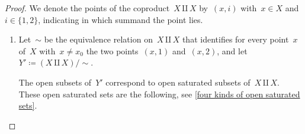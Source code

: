 \begin{proof}
	We denote the points of the coproduct~$X ⨿ X$ by~$(x, i)$ with~$x ∈ X$ and~$i ∈ \{ 1, 2 \}$, indicating in which summand the point lies.

	\begin{enumerate}

		\item
			Let~$∼$ be the equivalence relation on~$X ⨿ X$ that identifies for every point~$x$ of~$X$ with~$x ≠ x_0$ the two points~$(x, 1)$ and~$(x, 2)$, and let~$Y' ≔ (X ⨿ X) / {∼}$.

			The open subsets of~$Y'$ correspond to open saturated subsets of~$X ⨿ X$.
			These open saturated sets are the following, see \cref{four kinds of open saturated sets}.
\end{enumerate}
\end{proof}
